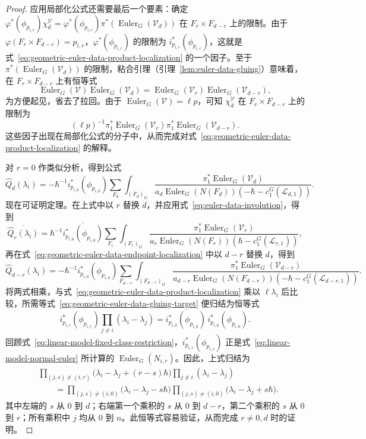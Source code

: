 \begin{proof}
应用局部化公式还需要最后一个要素：确定 $\varphi^*(\phi_{p_{i,r}})\chi_d^{\mathcal V}=\varphi^*(\phi_{p_{i,r}})\pi^*(\operatorname{Euler}_G(\mathcal V_d))$ 在 $F_r\times F_{d-r}$ 上的限制。由于 $\varphi(F_r\times F_{d-r})=p_{i,r}$，$\varphi^*(\phi_{p_{i,r}})$ 的限制为 $i_{p_{i,r}}^*(\phi_{p_{i,r}})$，这就是式~\eqref{eq:geometric-euler-data-product-localization} 的一个因子。至于
$\pi^*(\operatorname{Euler}_G(\mathcal V_d))$ 的限制，粘合引理（引理~\ref{lem:euler-data-gluing}）意味着，在 $F_r\times F_{d-r}$ 上有恒等式
\[
\operatorname{Euler}_G(\mathcal V)\operatorname{Euler}_G(\mathcal V_d)
=\operatorname{Euler}_G(\mathcal V_r)\operatorname{Euler}_G(\mathcal V_{d-r}),
\]
为方便起见，省去了拉回。由于 $\operatorname{Euler}_G(\mathcal V)=\ell p$，可知 $\chi_d^{\mathcal V}$ 在 $F_r\times F_{d-r}$ 上的限制为
\[
(\ell p)^{-1}\pi_1^*\operatorname{Euler}_G(\mathcal V_r)
\pi_1^*\operatorname{Euler}_G(\mathcal V_{d-r}).
\]
这些因子出现在局部化公式的分子中，从而完成对式~\eqref{eq:geometric-euler-data-product-localization} 的解释。

对 $r=0$ 作类似分析，得到公式
\begin{equation}\label{eq:geometric-euler-data-endpoint-localization}
\widehat Q_d(\lambda_i)=-\hbar^{-1}i_{p_{i,0}}^*(\phi_{p_{i,0}})
\sum_{F_d}\int_{(F_d)_G}
\frac{\pi_1^*\operatorname{Euler}_G(\mathcal V_d)}
{a_d\operatorname{Euler}_G(N(F_d))(-\hbar-c_1^G(\mathcal L_{d,1}))}.
\end{equation}
现在可证明定理。在上式中以 $r$ 替换 $d$，并应用式~\eqref{eq:euler-data-involution}，得到
\[
\overline{\widehat Q_r(\lambda_i)}
=\hbar^{-1}\overline{i_{p_{i,0}}^*(\phi_{p_{i,0}})}
\sum_{F_r}\int_{(F_r)_G}
\frac{\pi_1^*\operatorname{Euler}_G(\mathcal V_r)}
{a_r\operatorname{Euler}_G(N(F_r))(\hbar-c_1^G(\mathcal L_{r,1}))},
\]
再在式~\eqref{eq:geometric-euler-data-endpoint-localization} 中以 $d-r$ 替换 $d$，得到
\[
\widehat Q_{d-r}(\lambda_i)
=-\hbar^{-1}i_{p_{i,0}}^*(\phi_{p_{i,0}})
\sum_{F_{d-r}}\int_{(F_{d-r})_G}
\frac{\pi_1^*\operatorname{Euler}_G(\mathcal V_{d-r})}
{a_{d-r}\operatorname{Euler}_G(N(F_{d-r}))(-\hbar-c_1^G(\mathcal L_{d-r,1}))}.
\]
将两式相乘，与式~\eqref{eq:geometric-euler-data-product-localization} 乘以 $\ell\lambda_i$ 后比较，所需等式~\eqref{eq:geometric-euler-data-gluing-target} 便归结为恒等式
\[
i_{p_{i,r}}^*(\phi_{p_{i,r}})\prod_{j\ne i}(\lambda_i-\lambda_j)
=\overline{i_{p_{i,0}}^*(\phi_{p_{i,0}})}\,i_{p_{i,0}}^*(\phi_{p_{i,0}}).
\]
回顾式~\eqref{eq:linear-model-fixed-class-restriction}，$i_{p_{i,r}}^*(\phi_{p_{i,r}})$ 正是式~\eqref{eq:linear-model-normal-euler} 所计算的 $\operatorname{Euler}_G(N_{i,r})$。因此，上式归结为
\[
\begin{aligned}
&\prod_{(j,s)\ne(i,r)}\bigl(\lambda_i-\lambda_j+(r-s)\hbar\bigr)
\prod_{j\ne i}(\lambda_i-\lambda_j)\\
&\qquad=\prod_{(j,s)\ne(i,0)}\bigl(\lambda_i-\lambda_j-s\hbar\bigr)
\prod_{(j,s)\ne(i,0)}\bigl(\lambda_i-\lambda_j+s\hbar\bigr).
\end{aligned}
\]
其中左端的 $s$ 从 $0$ 到 $d$；右端第一个乘积的 $s$ 从 $0$ 到 $d-r$，第二个乘积的 $s$ 从 $0$ 到 $r$；所有乘积中 $j$ 均从 $0$ 到 $n$。此恒等式容易验证，从而完成 $r\ne0,d$ 时的证明。


\end{proof}
